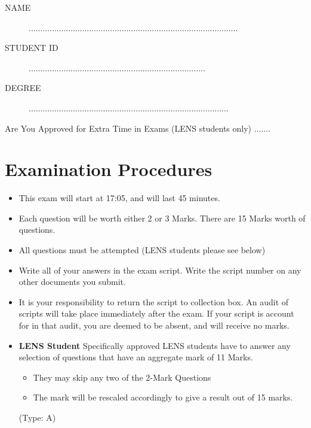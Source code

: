 \documentclass[11pt]{article} %
\begin{document}
	
	
	\Large
\newpage

\begin{framed}
\begin{description}
\item[NAME]  ..........................................................................................
\bigskip
\item[STUDENT ID] ............................................................................
\bigskip
\item[DEGREE] ......................................................................................
\end{description}
\end{framed}
\noindent Are You Approved for Extra Time in Exams (LENS students only)  .......
\section*{Examination Procedures}

\begin{itemize} 
	\item This exam will start at 17:05, and will last 45 minutes.
	
	\item Each question will be worth either 2 or 3 Marks. There are 15 Marks worth of questions.
	\item All questions must be attempted (LENS students please see below)
	
	\item Write all of your answers in the exam script. Write the script number on any other documents you submit.
	
	\item It is your responsibility to return the script to collection box. An audit of scripts will take place immediately after the exam. If your script is account for in that audit,  you are deemed to be absent, and will receive no marks.
	
	\item \textbf{LENS Student}
	Specifically approved LENS students have to answer any selection of questions that have an aggregate mark of 11 Marks.  
	\begin{itemize}
		\item They may skip any two of the 2-Mark Questions
		\item The mark will be rescaled accordingly to give a result out of 15 marks.
	\end{itemize}
(Type: A)	
	
\end{itemize}
\end{document}
